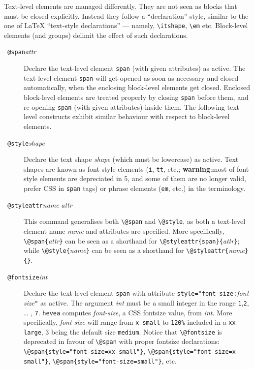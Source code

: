Text-level elements are managed differently. They are not seen
as blocks that must be closed explicitly.
Instead they follow a ``declaration'' style, similar
to the one of \LaTeX{} ``text-style declarations'' --- namely,
\verb+\itshape+, \verb+\em+ etc.
Block-level elements (and \html{} groups)
delimit the effect of such declarations.
\begin{description}
\item[{{\tt{} @span}{\it attr}{\tt{}}}]
Declare the text-level element \verb+span+ (with given attributes)
as active.
The text-level element \verb+span+ will get opened as soon as
necessary and closed automatically, when the
enclosing block-level elements get closed.
Enclosed block-level elements are treated properly by closing \verb+span+
before them, and re-opening \verb+span+ (with given attributes)
inside them.
The following text-level constructs exhibit similar behaviour with respect
to block-level elements.

\item[{\tt{} @style}{\it shape}{\tt{}}] Declare the
text shape \textit{shape} (which must be lowercase) as active. Text
shapes are known as font style elements (\verb+i+, \verb+tt+, etc.;
\textbf{warning}:most of font style elements are depreciated in \html{}5,
and some of them are no longer valid, prefer CSS in \verb+span+ tags)
or phrase elements (\verb+em+, etc.) in the \html{} terminology.


\item[{\tt{} @styleattr}{\it name}{\tt{}}{\it
attr}{\tt{}}]
This command generalises both \verb+\@span+ and \verb+\@style+,
as both a text-level element name \textit{name} and attributes are specified.
More specifically, 
\verb+\@span{+\textit{attr}\verb+}+ can be seen as a shorthand for
\verb+\@styleattr{span}{+\textit{attr}\verb+}+;
while
\verb+\@style{+\textit{name}\verb+}+ can be seen as
a shorthand for
\verb+\@styleattr{+\textit{name}\verb+}{}+.

\item[{\tt{} @fontsize}{\it int}{\tt{}}] Declare
the text-level element \verb+span+ with attribute
\verb+style="font-size:+\textit{font-size}\verb+"+ as active.
The argument
\textit{int} must be a small integer in the range
\texttt{1},\texttt{2}, \ldots{} , \texttt{7}.
\texttt{hevea} computes \textit{font-size}, a CSS fontsize value,
 from \textit{int}.
More specifically, \textit{font-size} will
range from \verb+x-small+ to \verb+120%+ included in
a \verb+xx-large+, 3 being the  default size \verb+medium+.
Notice that \verb+\@fontsize+ is deprecated in favour of
\verb+\@span+ with proper fontsize declarations:
\verb+\@span{style="font-size=xx-small"}+,
\verb+\@span{style="font-size=x-small"}+,
\verb+\@span{style="font-size=small"}+,
etc.



\end{description}
